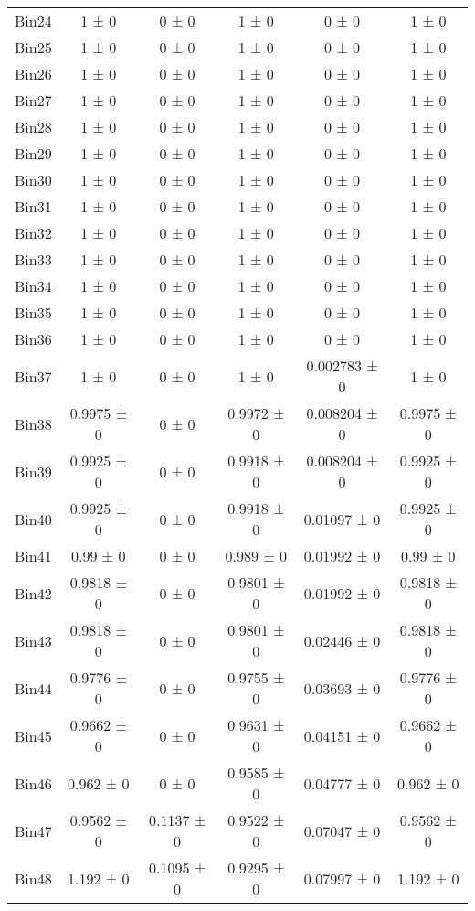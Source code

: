 \begin{tabular}{@{\extracolsep{4pt}}lccccc@{}}
     Bin24 & 1 ± 0 & 0 ± 0 & 1 ± 0 & 0 ± 0 & 1 ± 0 \\ 
     Bin25 & 1 ± 0 & 0 ± 0 & 1 ± 0 & 0 ± 0 & 1 ± 0 \\ 
     Bin26 & 1 ± 0 & 0 ± 0 & 1 ± 0 & 0 ± 0 & 1 ± 0 \\ 
     Bin27 & 1 ± 0 & 0 ± 0 & 1 ± 0 & 0 ± 0 & 1 ± 0 \\ 
     Bin28 & 1 ± 0 & 0 ± 0 & 1 ± 0 & 0 ± 0 & 1 ± 0 \\ 
     Bin29 & 1 ± 0 & 0 ± 0 & 1 ± 0 & 0 ± 0 & 1 ± 0 \\ 
     Bin30 & 1 ± 0 & 0 ± 0 & 1 ± 0 & 0 ± 0 & 1 ± 0 \\ 
     Bin31 & 1 ± 0 & 0 ± 0 & 1 ± 0 & 0 ± 0 & 1 ± 0 \\ 
     Bin32 & 1 ± 0 & 0 ± 0 & 1 ± 0 & 0 ± 0 & 1 ± 0 \\ 
     Bin33 & 1 ± 0 & 0 ± 0 & 1 ± 0 & 0 ± 0 & 1 ± 0 \\ 
     Bin34 & 1 ± 0 & 0 ± 0 & 1 ± 0 & 0 ± 0 & 1 ± 0 \\ 
     Bin35 & 1 ± 0 & 0 ± 0 & 1 ± 0 & 0 ± 0 & 1 ± 0 \\ 
     Bin36 & 1 ± 0 & 0 ± 0 & 1 ± 0 & 0 ± 0 & 1 ± 0 \\ 
     Bin37 & 1 ± 0 & 0 ± 0 & 1 ± 0 & 0.002783 ± 0 & 1 ± 0 \\ 
     Bin38 & 0.9975 ± 0 & 0 ± 0 & 0.9972 ± 0 & 0.008204 ± 0 & 0.9975 ± 0 \\ 
     Bin39 & 0.9925 ± 0 & 0 ± 0 & 0.9918 ± 0 & 0.008204 ± 0 & 0.9925 ± 0 \\ 
     Bin40 & 0.9925 ± 0 & 0 ± 0 & 0.9918 ± 0 & 0.01097 ± 0 & 0.9925 ± 0 \\ 
     Bin41 & 0.99 ± 0 & 0 ± 0 & 0.989 ± 0 & 0.01992 ± 0 & 0.99 ± 0 \\ 
     Bin42 & 0.9818 ± 0 & 0 ± 0 & 0.9801 ± 0 & 0.01992 ± 0 & 0.9818 ± 0 \\ 
     Bin43 & 0.9818 ± 0 & 0 ± 0 & 0.9801 ± 0 & 0.02446 ± 0 & 0.9818 ± 0 \\ 
     Bin44 & 0.9776 ± 0 & 0 ± 0 & 0.9755 ± 0 & 0.03693 ± 0 & 0.9776 ± 0 \\ 
     Bin45 & 0.9662 ± 0 & 0 ± 0 & 0.9631 ± 0 & 0.04151 ± 0 & 0.9662 ± 0 \\ 
     Bin46 & 0.962 ± 0 & 0 ± 0 & 0.9585 ± 0 & 0.04777 ± 0 & 0.962 ± 0 \\ 
     Bin47 & 0.9562 ± 0 & 0.1137 ± 0 & 0.9522 ± 0 & 0.07047 ± 0 & 0.9562 ± 0 \\ 
     Bin48 & 1.192 ± 0 & 0.1095 ± 0 & 0.9295 ± 0 & 0.07997 ± 0 & 1.192 ± 0 \\ 

\end{tabular}
